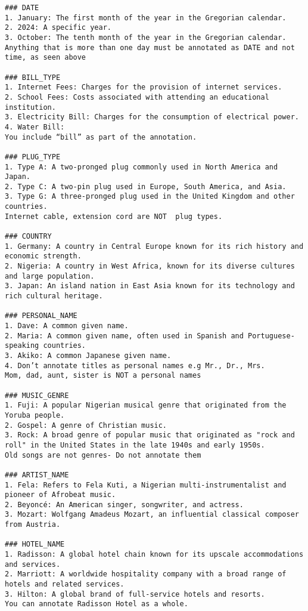 \begin{verbatim}
### DATE
1. January: The first month of the year in the Gregorian calendar.
2. 2024: A specific year.
3. October: The tenth month of the year in the Gregorian calendar.
Anything that is more than one day must be annotated as DATE and not time, as seen above 

### BILL_TYPE
1. Internet Fees: Charges for the provision of internet services.
2. School Fees: Costs associated with attending an educational institution.
3. Electricity Bill: Charges for the consumption of electrical power.
4. Water Bill: 
You include “bill” as part of the annotation.

### PLUG_TYPE
1. Type A: A two-pronged plug commonly used in North America and Japan.
2. Type C: A two-pin plug used in Europe, South America, and Asia.
3. Type G: A three-pronged plug used in the United Kingdom and other countries.
Internet cable, extension cord are NOT  plug types. 

### COUNTRY
1. Germany: A country in Central Europe known for its rich history and economic strength.
2. Nigeria: A country in West Africa, known for its diverse cultures and large population.
3. Japan: An island nation in East Asia known for its technology and rich cultural heritage.

### PERSONAL_NAME
1. Dave: A common given name.
2. Maria: A common given name, often used in Spanish and Portuguese-speaking countries.
3. Akiko: A common Japanese given name.
4. Don’t annotate titles as personal names e.g Mr., Dr., Mrs. 
Mom, dad, aunt, sister is NOT a personal names

### MUSIC_GENRE
1. Fuji: A popular Nigerian musical genre that originated from the Yoruba people.
2. Gospel: A genre of Christian music.
3. Rock: A broad genre of popular music that originated as "rock and roll" in the United States in the late 1940s and early 1950s.
Old songs are not genres- Do not annotate them

### ARTIST_NAME
1. Fela: Refers to Fela Kuti, a Nigerian multi-instrumentalist and pioneer of Afrobeat music.
2. Beyoncé: An American singer, songwriter, and actress.
3. Mozart: Wolfgang Amadeus Mozart, an influential classical composer from Austria.

### HOTEL_NAME
1. Radisson: A global hotel chain known for its upscale accommodations and services.
2. Marriott: A worldwide hospitality company with a broad range of hotels and related services.
3. Hilton: A global brand of full-service hotels and resorts.
You can annotate Radisson Hotel as a whole.


\end{verbatim}
